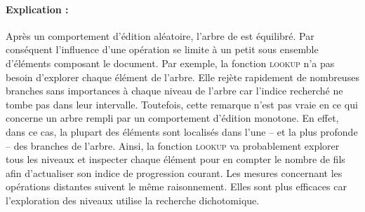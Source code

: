 \paragraph{Explication :} Après un comportement d'édition aléatoire, l'arbre de
\LSEQ est équilibré. Par conséquent l'influence d'une opération se limite à un
petit sous ensemble d'éléments composant le document. Par exemple, la fonction
\textsc{lookup} n'a pas besoin d'explorer chaque élément de l'arbre. Elle rejète
rapidement de nombreuses branches sans importances à chaque niveau de l'arbre
car l'indice recherché ne tombe pas dans leur intervalle. Toutefois, cette
remarque n'est pas vraie en ce qui concerne un arbre rempli par un comportement
d'édition monotone. En effet, dans ce cas, la plupart des éléments sont
localisés dans l'une -- et la plus profonde -- des branches de l'arbre. Ainsi,
la fonction \textsc{lookup} va probablement explorer tous les niveaux et
inspecter chaque élément pour en compter le nombre de fils afin d'actualiser son
indice de progression courant. Les mesures concernant les opérations distantes
suivent le même raisonnement. Elles sont plus efficaces car l'exploration des
niveaux utilise la recherche dichotomique.


